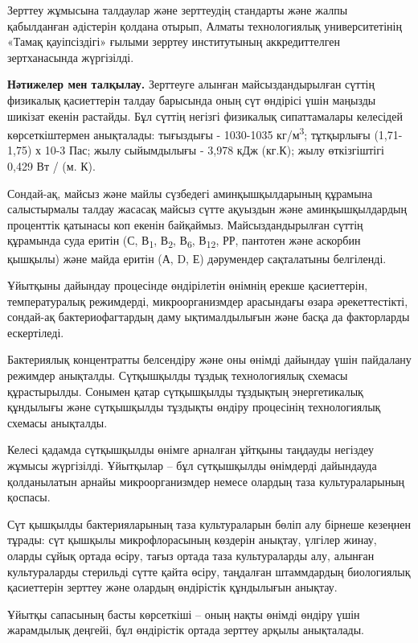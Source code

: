 \begin{multicols}{2}
Зерттеу жұмысына талдаулар және зерттеудің стандарты және жалпы
қабылданған әдістерін қолдана отырып, Алматы технологиялық
университетінің «Тамақ қауіпсіздігі» ғылыми зерртеу институтының
аккредиттелген зертханасында жүргізілді.

{\bfseries Нәтижелер мен талқылау.} Зерттеуге алынған майсыздандырылған
сүттің физикалық қасиеттерін талдау барысында оның сүт өндірісі үшін
маңызды шикізат екенін растайды. Бұл сүттің негізгі физикалық
сипаттамалары келесідей көрсеткіштермен анықталады: тығыздығы -
1030-1035 кг/м\textsuperscript{3}; тұтқырлығы (1,71-1,75) х 10-3 Пас;
жылу сыйымдылығы - 3,978 кДж (кг.К); жылу өткізгіштігі 0,429 Вт / (м.
К).

Сондай-ақ, майсыз және майлы сүзбедегі аминқышқылдарының құрамына
салыстырмалы талдау жасасақ майсыз сүтте ақуыздын және аминқышқылдардың
проценттік қатынасы коп екенін байқаймыз. Майсыздандырылған сүттің
құрамында суда еритін (С, В\textsubscript{1}, В\textsubscript{2},
В\textsubscript{6}, В\textsubscript{12}, РР, пантотен және аскорбин
қышқылы) және майда еритін (А, D, Е) дәрумендер сақталатыны белгіленді.

Ұйытқыны дайындау процесінде өндірілетін өнімнің ерекше қасиеттерін,
температуралық режимдерді, микроорганизмдер арасындағы өзара
әрекеттестікті, сондай-ақ бактериофагтардың даму ықтималдылығын және
басқа да факторларды ескертіледі.

Бактериялық концентратты белсендіру және оны өнімді дайындау үшін
пайдалану режимдер анықталды. Сүтқышқылды тұздық технологиялық схемасы
құрастырылды. Сонымен қатар сүтқышқылды тұздықтың энергетикалық
құндылығы және сүтқышқылды тұздықты өндіру процесінің технологиялық
схемасы анықталды.

Келесі қадамда сүтқышқылды өнімге арналған ұйтқыны таңдауды негіздеу
жұмысы жүргізілді. Ұйытқылар -- бұл сүтқышқылды өнімдерді дайындауда
қолданылатын арнайы микроорганизмдер немесе олардың таза культураларының
қоспасы.

Сүт қышқылды бактерияларының таза культураларын бөліп алу бірнеше
кезеңнен тұрады: сүт қышқылы микрофлорасының көздерін анықтау, үлгілер
жинау, оларды сұйық ортада өсіру, тағыз ортада таза культураларды алу,
алынған культураларды стерильді сүтте қайта өсіру, таңдалған штаммдардың
биологиялық қасиеттерін зерттеу және олардың өндірістік құндылығын
анықтау.

Ұйытқы сапасының басты көрсеткіші -- оның нақты өнімді өндіру үшін
жарамдылық деңгейі, бұл өндірістік ортада зерттеу арқылы анықталады.


\end{multicols}
